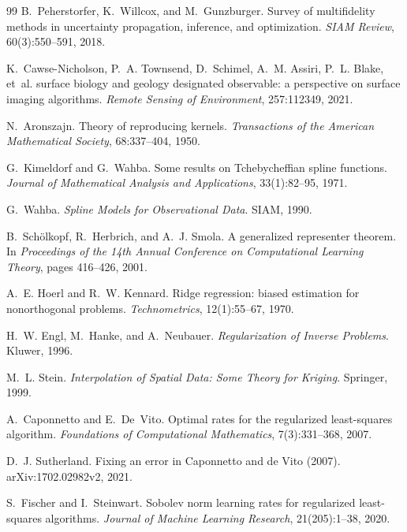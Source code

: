 \begin{thebibliography}{99}
B.~Peherstorfer, K.~Willcox, and M.~Gunzburger.
\newblock Survey of multifidelity methods in uncertainty propagation, inference, and
optimization.
\newblock \emph{SIAM Review}, 60(3):550--591, 2018.

K.~Cawse-Nicholson, P.~A. Townsend, D.~Schimel, A.~M. Assiri, P.~L. Blake, et~al.
 surface biology and geology designated observable: a perspective on surface
imaging algorithms.
\newblock \emph{Remote Sensing of Environment}, 257:112349, 2021.

N.~Aronszajn.
\newblock Theory of reproducing kernels.
\newblock \emph{Transactions of the American Mathematical Society}, 68:337--404, 1950.

G.~Kimeldorf and G.~Wahba.
\newblock Some results on {Tchebycheffian} spline functions.
\newblock \emph{Journal of Mathematical Analysis and Applications}, 33(1):82--95, 1971.

G.~Wahba.
\newblock \emph{Spline Models for Observational Data}.
\newblock SIAM, 1990.

B.~Sch\"olkopf, R.~Herbrich, and A.~J. Smola.
\newblock A generalized representer theorem.
\newblock In \emph{Proceedings of the 14th Annual Conference on Computational Learning
Theory}, pages 416--426, 2001.

A.~E. Hoerl and R.~W. Kennard.
\newblock Ridge regression: biased estimation for nonorthogonal problems.
\newblock \emph{Technometrics}, 12(1):55--67, 1970.

H.~W. Engl, M.~Hanke, and A.~Neubauer.
\newblock \emph{Regularization of Inverse Problems}.
\newblock Kluwer, 1996.

M.~L. Stein.
\newblock \emph{Interpolation of Spatial Data: Some Theory for Kriging}.
\newblock Springer, 1999.

A.~Caponnetto and E.~De~Vito.
\newblock Optimal rates for the regularized least-squares algorithm.
\newblock \emph{Foundations of Computational Mathematics}, 7(3):331--368, 2007.

D.~J. Sutherland.
\newblock Fixing an error in Caponnetto and de Vito (2007).
\newblock arXiv:1702.02982v2, 2021.

S.~Fischer and I.~Steinwart.
\newblock Sobolev norm learning rates for regularized least-squares algorithms.
\newblock \emph{Journal of Machine Learning Research}, 21(205):1--38, 2020.


\end{thebibliography}

